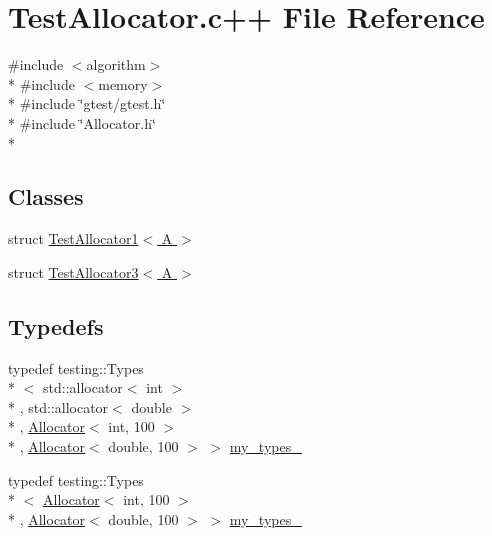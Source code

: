 \hypertarget{TestAllocator_8c_09_09}{\section{Test\-Allocator.\-c++ File Reference}
\label{TestAllocator_8c_09_09}
}
{\ttfamily \#include $<$algorithm$>$}\\*
{\ttfamily \#include $<$memory$>$}\\*
{\ttfamily \#include \char`\"{}gtest/gtest.\-h\char`\"{}}\\*
{\ttfamily \#include \char`\"{}Allocator.\-h\char`\"{}}\\*
\subsection*{Classes}
\begin{DoxyCompactItemize}
\item 
struct \hyperlink{structTestAllocator1}{Test\-Allocator1$<$ A $>$}
\item 
struct \hyperlink{structTestAllocator3}{Test\-Allocator3$<$ A $>$}
\end{DoxyCompactItemize}
\subsection*{Typedefs}
\begin{DoxyCompactItemize}
\item 
typedef testing\-::\-Types\\*
$<$ std\-::allocator$<$ int $>$\\*
, std\-::allocator$<$ double $>$\\*
, \hyperlink{classAllocator}{Allocator}$<$ int, 100 $>$\\*
, \hyperlink{classAllocator}{Allocator}$<$ double, 100 $>$ $>$ \hyperlink{TestAllocator_8c_09_09_a13869bd8140d5f03f67a74c18b4a9483}{my\-\_\-types\-\_}
\item 
typedef testing\-::\-Types\\*
$<$ \hyperlink{classAllocator}{Allocator}$<$ int, 100 $>$\\*
, \hyperlink{classAllocator}{Allocator}$<$ double, 100 $>$ $>$ \hyperlink{TestAllocator_8c_09_09_ae8c7ebc24b7c1269b8c59135bef34e20}{my\-\_\-types\-\_}
\end{DoxyCompactItemize}
